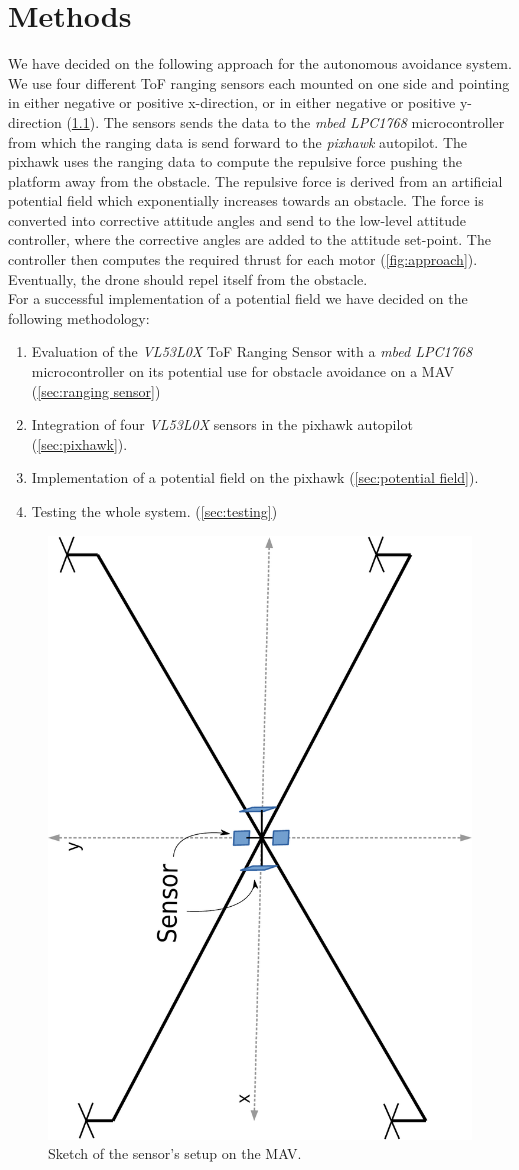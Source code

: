 \chapter{Methods}
\label{ch:methods}
We have decided on the following approach for the autonomous avoidance system. We use four different ToF ranging sensors each mounted on one side and pointing in either negative or positive x-direction, or in either negative or positive y-direction (\cref{fig:sketch}). The sensors sends the data to the \textit{mbed LPC1768} microcontroller from which the ranging data is send forward to the \textit{pixhawk} autopilot. The pixhawk uses the ranging data to compute the repulsive force pushing the platform away from the obstacle. The repulsive force is derived from an artificial potential field which exponentially increases towards an obstacle. The force is converted into corrective attitude angles and send to the low-level attitude controller, where the corrective angles are added to the attitude set-point. The controller then computes the required thrust for each motor (\cref{fig:approach}). Eventually, the drone should repel itself from the obstacle.\\
For a successful implementation of a potential field we have decided on the following methodology:
\begin{enumerate}
	\item Evaluation of the \textit{VL53L0X} ToF Ranging Sensor with a \textit{mbed LPC1768} microcontroller on its potential use for obstacle avoidance on a MAV (\cref{sec:ranging sensor})
	\item Integration of four \textit{VL53L0X} sensors in the pixhawk autopilot (\cref{sec:pixhawk}).
	\item Implementation of a potential field on the pixhawk (\cref{sec:potential field}).
	\item Testing the whole system.  (\cref{sec:testing})
\end{enumerate}
\begin{figure}
	\centering
	\includegraphics[width=0.4\linewidth, angle = 270]{pictures/mav_sketch.pdf}
	\caption{Sketch of the sensor's setup on the MAV.}
	\label{fig:sketch}
\end{figure}

